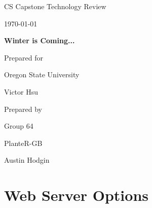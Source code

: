 \documentclass[onecolumn, draftclsnofoot,10pt, compsoc]{IEEEtran}
\def \CapstoneTeamName{			              			 PlanteR-GB}
\def \CapstoneTeamNumber{					           			 Group 64}
\def \GroupMemberOne{				           				Austin Hodgin}
\def \CapstoneProjectName{	      	    Winter is Coming...}
\def \CapstoneSponsorCompany{		    Oregon State University}
\def \CapstoneSponsorPerson{		 			  				 Victor Hsu}
\def \DocType{		%
				Technology Review
				}
\newcommand{\NameSigPair}[1]{\par
\makebox[2.75in][r]{#1} \hfil 	\makebox[3.25in]{\makebox[2.25in]{\hrulefill} \hfill		\makebox[.75in]{\hrulefill}}
\par\vspace{-12pt} \textit{\tiny\noindent
\makebox[2.75in]{} \hfil		\makebox[3.25in]{\makebox[2.25in][r]{Signature} \hfill	\makebox[.75in][r]{Date}}}}
\renewcommand{\NameSigPair}[1]{#1}
\begin{document}
\begin{titlepage}
    \begin{singlespace}
        \hfill
        \par\vspace{.2in}
        \centering
        \scshape{
            \huge CS Capstone \DocType \par
            {\large\today}\par
            \vspace{.5in}
            \textbf{\Huge\CapstoneProjectName}\par
						\vspace{1in}
            {\large Prepared for}\par
            \Huge \CapstoneSponsorCompany\par
            \vspace{5pt}
            {\Large\NameSigPair{\CapstoneSponsorPerson}\par}
						\vspace{1in}
            {\large Prepared by}\par
						{\huge \CapstoneTeamNumber}\par
            \CapstoneTeamName\par
            \vspace{5pt}
            {
							\Large
							\NameSigPair{\GroupMemberOne}\par
            }
            \vspace{20pt}
        }

        \begin{abstract}
				This document will go over three different technologies related to the project.
				Each technology has three options discussed as a possible solution for
				that technology. The three technologies we will look at are, Mobile interfaces,
				web servers and moisture sensors.
        \end{abstract}
    \end{singlespace}
\end{titlepage}
\newpage
{}
\tableofcontents
\clearpage
\singlespace


	\section{Web Server Options}
\end{document}
